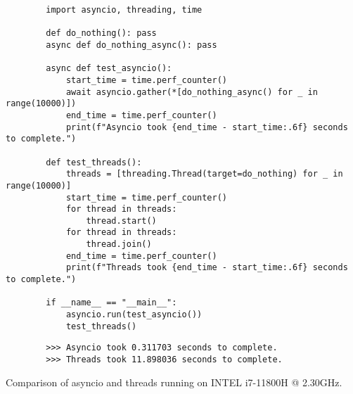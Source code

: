 \begin{listing}[H]
    \begin{verbatim}
        import asyncio, threading, time

        def do_nothing(): pass
        async def do_nothing_async(): pass

        async def test_asyncio():
            start_time = time.perf_counter()
            await asyncio.gather(*[do_nothing_async() for _ in range(10000)])
            end_time = time.perf_counter()
            print(f"Asyncio took {end_time - start_time:.6f} seconds to complete.")

        def test_threads():
            threads = [threading.Thread(target=do_nothing) for _ in range(10000)]
            start_time = time.perf_counter()
            for thread in threads:
                thread.start()
            for thread in threads:
                thread.join()
            end_time = time.perf_counter()
            print(f"Threads took {end_time - start_time:.6f} seconds to complete.")

        if __name__ == "__main__":
            asyncio.run(test_asyncio())
            test_threads()
    \end{verbatim}
    \begin{verbatim}
        >>> Asyncio took 0.311703 seconds to complete.
        >>> Threads took 11.898036 seconds to complete.
    \end{verbatim}
    \caption{Comparison of asyncio and threads running on INTEL i7-11800H @ 2.30GHz.}
\end{listing}